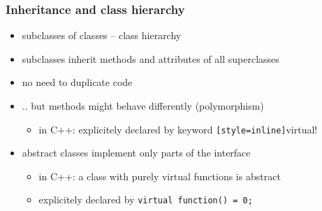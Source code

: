 \documentclass{slides}
\begin{document}
\begin{frame}
  \frametitle{Inheritance and class hierarchy}

  \begin{center}
  \end{center}
  
  \begin{itemize}
    \item subclasses of classes -- \alert{class hierarchy}
    \item subclasses inherit methods and attributes of all superclasses
    \item no need to duplicate code
    \item .. but methods might behave differently
      (\alert{polymorphism})
      \begin{itemize}
      \item in C++: explicitely declared by keyword \lstinline![style=inline]!virtual!
    \end{itemize}
    \item \alert{abstract class}es implement only parts of the interface
      \begin{itemize}
      \item in C++: a class with purely virtual functions is abstract
      \item explicitely declared by \lstinline[style=inline]!virtual function() = 0;!
      \end{itemize}
    \end{itemize}
\end{frame}
\end{document}
